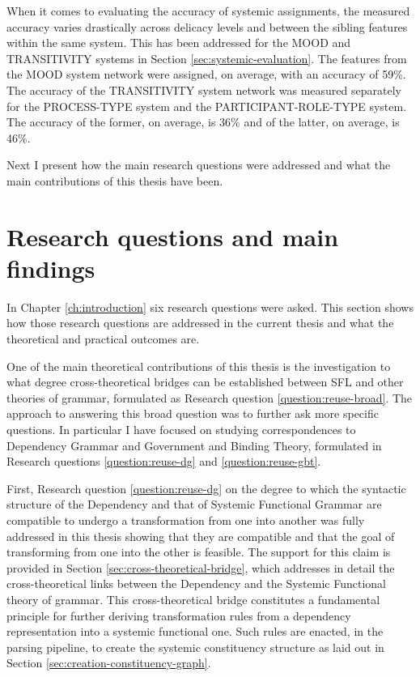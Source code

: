     When it comes to evaluating the accuracy of systemic assignments, the measured accuracy varies drastically across delicacy levels and between the sibling features within the same system. This has been addressed for the MOOD and TRANSITIVITY systems in Section \ref{sec:systemic-evaluation}. The features from the MOOD system network were assigned, on average, with an accuracy of 59\%. The accuracy of the TRANSITIVITY system network was measured separately for the PROCESS-TYPE system and the PARTICIPANT-ROLE-TYPE system. The accuracy of the former, on average, is 36\% and of the latter, on average, is 46\%. 

    Next I present how the main research questions were addressed and what the main contributions of this thesis have been.
    

\section{Research questions and main findings}
    In Chapter \ref{ch:introduction} six research questions were asked. This section shows how those research questions are addressed in the current thesis and what the theoretical and practical outcomes are.
    
    One of the main theoretical contributions of this thesis is the investigation to what degree cross-theoretical bridges can be established between SFL and other theories of grammar, formulated as Research question \ref{question:reuse-broad}. 
    The approach to answering this broad question was to further ask more specific questions. In particular I have focused on studying correspondences to Dependency Grammar and Government and Binding Theory, formulated in Research questions \ref{question:reuse-dg} and \ref{question:reuse-gbt}. 

    First, Research question \ref{question:reuse-dg} on the degree to which the syntactic structure of the Dependency and that of Systemic Functional Grammar are compatible to undergo a transformation from one into another was fully addressed in this thesis showing that they are compatible and that the goal of transforming from one into the other is feasible. The support for this claim is provided in Section \ref{sec:cross-theoretical-bridge}, which addresses in detail the cross-theoretical links between the Dependency and the Systemic Functional theory of grammar. This cross-theoretical bridge constitutes a fundamental principle for further deriving transformation rules from a dependency representation into a systemic functional one. Such rules are enacted, in the parsing pipeline, to create the systemic constituency structure as laid out in Section \ref{sec:creation-constituency-graph}. 
    
